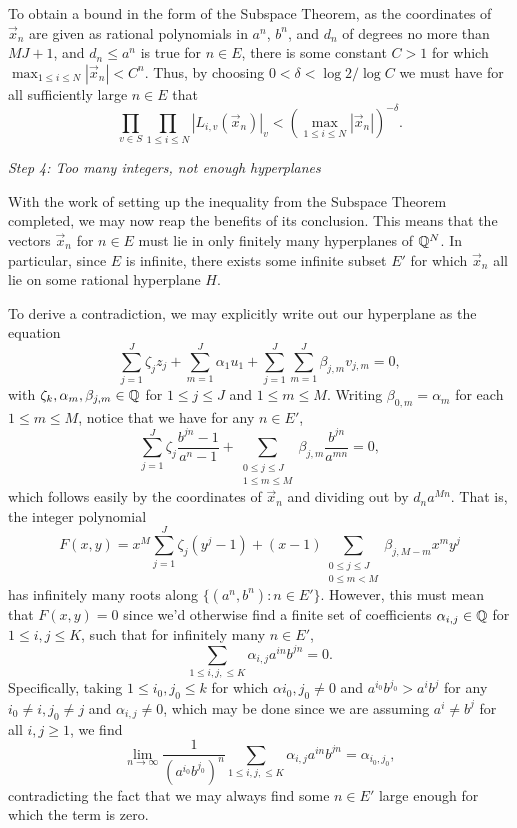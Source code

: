 To obtain a bound in the form of the Subspace Theorem,
as the coordinates of $\vec{x}_n$ are given as rational polynomials in $a^n$, $b^n$, and $d_n$ of degrees no more than $MJ + 1$,
and $d_n \leq a^n$ is true for $n \in E$,
there is some constant $C > 1$ for which $\max_{1 \leq i \leq N} |\vec{x}_n| < C^n$.
Thus, by choosing $0 < \delta < \log 2 / \log C$
we must have for all sufficiently large $n \in E$ that
\[
    \prod_{v \in S} \prod_{1 \leq i \leq N} |L_{i, v}(\vec{x}_n)|_v
    < (\max_{1 \leq i \leq N} |\vec{x}_n|)^{-\delta}.
\]


\noindent\textit{Step 4: Too many integers, not enough hyperplanes}

With the work of setting up the inequality from the Subspace Theorem completed,
we may now reap the benefits of its conclusion.
This means that the vectors $\vec{x}_n$ for $n \in E$ must lie in only finitely many hyperplanes of $\mathbb{Q}^N$.
In particular, since $E$ is infinite,
there exists some infinite subset $E'$ for which $\vec{x}_n$ all lie on some rational hyperplane $H$.

To derive a contradiction,
we may explicitly write out our hyperplane as the equation
\[
    \sum_{j = 1}^J \zeta_j z_j
    + \sum_{m = 1}^J \alpha_1 u_1 
    + \sum_{j = 1}^J \sum_{m = 1}^J \beta_{j, m} v_{j,m}
    = 0,
\]
with $\zeta_k, \alpha_m, \beta_{j, m} \in \mathbb{Q}$ for $1 \leq j \leq J$ and $1 \leq m \leq M$.
Writing $\beta_{0,m} = \alpha_m$ for each $1 \leq m \leq M$,
notice that we have for any $n \in E'$,
\[
    \sum_{j = 1}^J \zeta_j \frac{b^{jn} - 1}{a^n - 1}
    + \sum_{\substack{
        0 \leq j \leq J \\
        1 \leq m \leq M 
    }} \beta_{j, m} \frac{b^{jn}}{a^{mn}}
    = 0,
\]
which follows easily by the coordinates of $\vec{x}_n$ and dividing out by $d_n a^{Mn}$.
That is, the integer polynomial
\[
    F(x, y) = x^M \sum_{j = 1}^J \zeta_j (y^j - 1)
    + (x - 1) \sum_{\substack{
        0 \leq j \leq J \\
        0 \leq m < M 
    }} \beta_{j, M - m} x^my^j
\]
has infinitely many roots along $\{(a^n, b^n) : n \in E'\}$.
However, this must mean that $F(x, y) = 0$ since we'd otherwise find a finite set of coefficients $\alpha_{i,j} \in \mathbb{Q}$ for $1 \leq i, j \leq K$,
such that for infinitely many $n \in E'$,
\[
    \sum_{1 \leq i, j, \leq K} \alpha_{i, j} a^{i n} b^{j n} = 0.
\]
Specifically, taking $1 \leq i_0, j_0 \leq k$ for which $\alpha{i_0,j_0} \neq 0$ and $a^{i_0}b^{j_0} > a^i b^j$ for any $i_0 \neq i, j_0 \neq j$ and $\alpha_{i,j} \neq 0$,
which may be done since we are assuming $a^i \neq b^j$ for all $i, j \geq 1$,
we find
\[
    \lim_{n \to \infty} \frac{1}{(a^{i_0}b^{j_0})^n} \sum_{1 \leq i, j, \leq K} \alpha_{i, j} a^{i n} b^{j n}
    = \alpha_{i_0, j_0},
\]
contradicting the fact that we may always find some $n \in E'$ large enough for which the term is zero.

